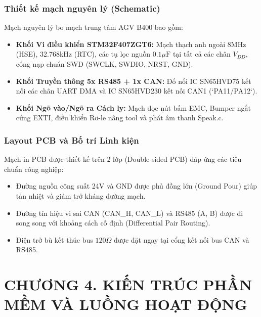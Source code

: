 \documentclass{article}
\begin{document}
\subsubsection{Thiết kế mạch nguyên lý (Schematic)}
Mạch nguyên lý bo mạch trung tâm AGV B400 bao gồm:
\begin{itemize}
    \item \textbf{Khối Vi điều khiển STM32F407ZGT6:} Mạch thạch anh ngoài 8MHz (HSE), 32.768kHz (RTC), các tụ lọc nguồn $0.1\mu\text{F}$ tại tất cả các chân $V_{DD}$, cổng nạp chuẩn SWD (SWCLK, SWDIO, NRST, GND).
    \item \textbf{Khối Truyền thông 5x RS485 + 1x CAN:} Đố nối IC SN65HVD75 kết nối các chân UART DMA và IC SN65HVD230 kết nối CAN1 (`PA11/PA12`).
    \item \textbf{Khối Ngõ vào/Ngõ ra Cách ly:} Mạch đọc nút bấm EMC, Bumper ngắt cứng EXTI, điều khiển Rơ-le nâng tool và phát âm thanh Speak.c.
\end{itemize}

\subsubsection{Layout PCB và Bố trí Linh kiện}
Mạch in PCB được thiết kế trên 2 lớp (Double-sided PCB) đáp ứng các tiêu chuẩn công nghiệp:
\begin{itemize}
    \item Đường nguồn công suất 24V và GND được phủ đồng lớn (Ground Pour) giúp tản nhiệt và giảm trở kháng đường mạch.
    \item Đường tín hiệu vi sai CAN (CAN\_H, CAN\_L) và RS485 (A, B) được đi song song với khoảng cách cố định (Differential Pair Routing).
    \item Điện trở bù kết thúc bus $120\Omega$ được đặt ngay tại cổng kết nối bus CAN và RS485.
\end{itemize}

\clearpage

\section*{CHƯƠNG 4. KIẾN TRÚC PHẦN MỀM VÀ LUỒNG HOẠT ĐỘNG}
\setcounter{section}{4}
\setcounter{subsection}{0}
\setcounter{figure}{0}
\setcounter{table}{0}
\end{document}
